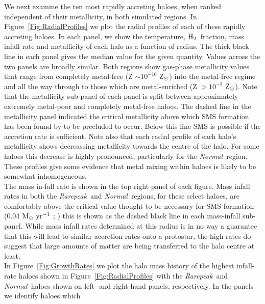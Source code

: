 \documentclass[graphics, twocolumn, usenatbib]{mn2e}
\newcommand{\msolaryr} {$\rm{M_{\odot}~yr^{-1}}~$}
\newcommand{\zsolarc} {$\rm{Z_{\odot}}$}
\newcommand{\molH} {$\rm{H_2}$~}
\newcommand{\rarepeak} {\textit{Rarepeak~}}
\newcommand{\normal} {\textit{Normal~}}
\begin{document}
\indent We next examine the ten most rapidly accreting haloes, when ranked independent of their metallicity, in both simulated regions.
In Figure~\ref{Fig:RadialProfiles} we plot the radial profiles of each of these rapidly
accreting haloes.
In each panel, we show the temperature, \molH fraction, mass infall rate and
metallicity of each halo as a function of radius. 
The thick black line in each panel gives the
median value for the given quantity. Values across the two panels are broadly similar. Both regions
show gas-phase metallicity values that range from completely metal-free (Z $\sim 10^{-16}$ \zsolarc)
into the metal-free regime and all the way through to those which are metal-enriched (Z $> 10^{-3}$
\zsolarc). Note that the metallicity sub-panel of each panel
is split between approximately extremely metal-poor and completely metal-free haloes. The dashed
line in the metallicity panel indicated the critical metallicity above which SMS formation
has been found by \cite{Chon_2020} to be precluded to occur. Below this line SMS is possible if the
accretion rate is sufficient. Note also that each radial profile of each halo's  metallicity shows
decreassing metallicity towards the centre of the halo. For some haloes this decrease is highly
pronounced, particularly for the \normal region. These profiles give some evidence that metal
mixing within haloes is likely to be somewhat inhomogeneous. \\
\indent The mass in-fall rate is shown in the top right panel of each figure. 
Mass infall rates in both the \rarepeak and \normal regions, for these select haloes, are
comfortably above the critical value thought to be necessary for SMS formation (0.04
\msolaryr; \citealt{Sakurai_2016}) this is shown as the dashed black line in each mass-infall sub-panel.
While mass infall rates determined at this radius is in no
way a guarantee that this will lead to similar accretion rates onto a protostar, the high rates do
suggest that large amounts of matter are being transferred to the halo centre at least. \\
\indent In Figure~\ref{Fig:GrowthRates} we plot the halo mass history of the highest infall-rate haloes shown in Figure~\ref{Fig:RadialProfiles} with the \rarepeak and \normal haloes
shown on left- and right-hand panels, respectively. In the panels we identify haloes which
\end{document}
